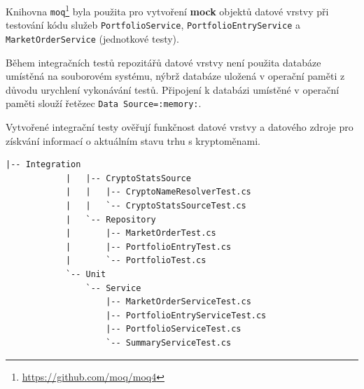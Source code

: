 \documentclass[12pt, a4paper]{article}
\begin{document}
    Knihovna \texttt{moq}\footnote{\url{https://github.com/moq/moq4}} byla použita pro vytvoření \textbf{mock} objektů datové vrstvy při testování kódu služeb \texttt{PortfolioService}, \texttt{PortfolioEntryService} a \texttt{MarketOrderService} (jednotkové testy).

    Během integračních testů repozitářů datové vrstvy není použita databáze umístěná na souborovém systému, nýbrž databáze uložená v operační paměti z důvodu urychlení vykonávání testů. Připojení k databázi umístěné v operační paměti slouží řetězec \texttt{Data Source=:memory:}.

    Vytvořené integrační testy ověřují funkčnost datové vrstvy a datového zdroje pro získvání informací o aktuálním stavu trhu s kryptoměnami.

    \begin{lstlisting}[caption={Struktura projektu \texttt{Tests} obsahující integrační a jednotkové testy}, captionpos=b]
            |-- Integration
            |   |-- CryptoStatsSource
            |   |   |-- CryptoNameResolverTest.cs
            |   |   `-- CryptoStatsSourceTest.cs
            |   `-- Repository
            |       |-- MarketOrderTest.cs
            |       |-- PortfolioEntryTest.cs
            |       `-- PortfolioTest.cs
            `-- Unit
                `-- Service
                    |-- MarketOrderServiceTest.cs
                    |-- PortfolioEntryServiceTest.cs
                    |-- PortfolioServiceTest.cs
                    `-- SummaryServiceTest.cs
    \end{lstlisting}



    \printbibliography
\end{document}
